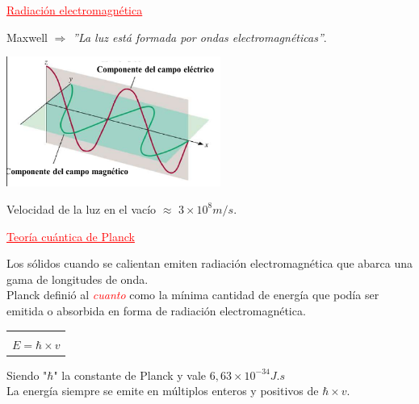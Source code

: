         \begin{center} \textcolor{red}{\underline{Radiación electromagnética}} \end{center}
            \indent Maxwell $\Rightarrow$ \textit{''La luz está formada por ondas electromagnéticas''}.
            \saltoPag%
            \begin{center} \includegraphics[width=7cm]{./imagenes/componentesDeUnaOnda.png} \end{center}
            \indent Velocidad de la luz en el vacío $\approx$ $3 \times 10^{8} m/s$.

        \begin{center} \textcolor{red}{\underline{Teoría cuántica de Planck}} \end{center}
            \indent Los sólidos cuando se calientan emiten radiación electromagnética que abarca una gama de longitudes de onda. \\
            \indent Planck definió al \textcolor{red}{\textit{cuanto}} como la mínima cantidad de energía que podía ser emitida o absorbida en forma de radiación electromagnética.

            \begin{center} \begin{tabular}{| c |} \hline \\ $E = \hbar \times v$ \\ \hline \end{tabular} \end{center}
            \indent Siendo "$\hbar$" la constante de Planck y vale $6,63 \times 10^{-34} J.s$ \\
            \indent La energía siempre se emite en múltiplos enteros y positivos de $\hbar \times v$.

